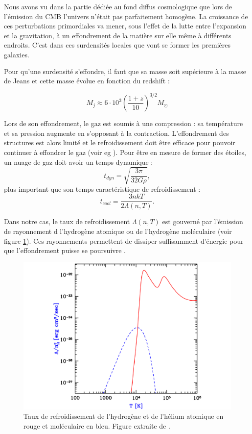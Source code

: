 Nous avons vu dans la partie dédiée au fond diffus cosmologique que lors de l'émission du \ac{CMB} l'univers n'était pas parfaitement homogène.
La croissance de ces perturbations primordiales va mener, sous l'effet de la lutte entre l'expansion et la gravitation, à un effondrement de la matière sur elle même à différents endroits.
C'est dans ces surdensités locales que vont se former les premières galaxies.

Pour qu'une surdensité s'effondre, il faut que sa masse soit supérieure à la masse de Jeans et cette masse évolue en fonction du redshift \citep{2016PhR...645....1B} : 

\begin{equation}
M_j \approx 6 \cdot 10 ^3 \left( \frac{1+z}{10} \right)^{3/2} M_\odot
\end{equation}

Lors de son effondrement, le gaz est soumis à une compression : sa température et sa pression augmente en s'opposant à la contraction.
L'effondrement des structures est alors limité et le refroidissement doit être efficace pour pouvoir continuer à effondrer le gaz (voir eg \cite{2004ARA&A..42...79B}).
Pour être en mesure de former des étoiles, un nuage de gaz doit avoir un temps dynamique :
\begin{equation}
t_{dyn} =\sqrt{\frac{3 \pi}{32 G \rho}},
\end{equation}
plus important que son temps caractéristique de refroidissement :
\begin{equation}
t_{cool} = \frac{3 nkT}{2 \Lambda(n,T)}.
\end{equation}

Dans notre cas, le taux de refroidissement $\Lambda(n,T)$ est gouverné par l'émission de rayonnement d l'hydrogène atomique ou de l'hydrogène moléculaire (voir figure \ref{fig:refroidissement}).
Ces rayonnements permettent de dissiper suffisamment d'énergie pour que l'effondrement puisse se poursuivre \citep{2001PhR...349..125B}.

\begin{figure}
        \includegraphics[width=.95\linewidth]{img/01/fonction_refroidissement.pdf} 
        \caption[Fonction de refroidissement]{Taux de refroidissement de l'hydrogène et de l'hélium atomique en rouge et moléculaire en bleu. 
        Figure extraite de \cite{2016PhR...645....1B}.
 		\label{fig:refroidissement}}
\end{figure}

